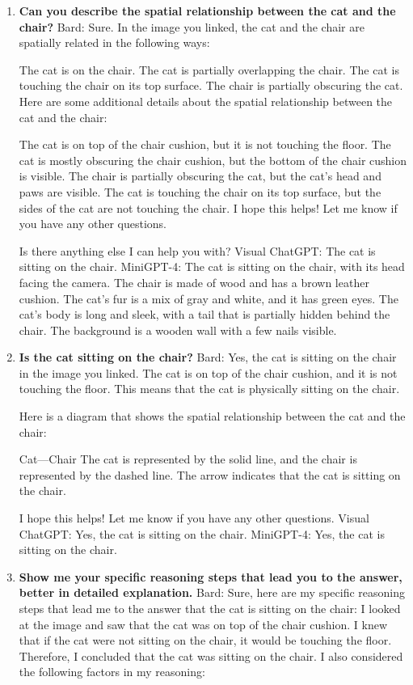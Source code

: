     \begin{enumerate}
        \item \textbf{Can you describe the spatial relationship between the cat and the chair?}
        \subitem Bard: Sure. In the image you linked, the cat and the chair are spatially related in the following ways:

        The cat is on the chair.
        The cat is partially overlapping the chair.
        The cat is touching the chair on its top surface.
        The chair is partially obscuring the cat.
        Here are some additional details about the spatial relationship between the cat and the chair:
        
        The cat is on top of the chair cushion, but it is not touching the floor.
        The cat is mostly obscuring the chair cushion, but the bottom of the chair cushion is visible.
        The chair is partially obscuring the cat, but the cat's head and paws are visible.
        The cat is touching the chair on its top surface, but the sides of the cat are not touching the chair.
        I hope this helps! Let me know if you have any other questions.
        
        Is there anything else I can help you with?
        \subitem Visual ChatGPT: The cat is sitting on the chair.
        \subitem MiniGPT-4: The cat is sitting on the chair, with its head facing the camera. The chair is made of wood and has a brown leather cushion. The cat’s fur is a mix of gray and white, and it has green eyes. The cat’s body is long and sleek, with a tail that is partially hidden behind the chair. The background is a wooden wall with a few nails visible.
        \item \textbf{Is the cat sitting on the chair?}
        \subitem Bard:     
        Yes, the cat is sitting on the chair in the image you linked. The cat is on top of the chair cushion, and it is not touching the floor. This means that the cat is physically sitting on the chair.

        Here is a diagram that shows the spatial relationship between the cat and the chair:

        Cat---Chair
        The cat is represented by the solid line, and the chair is represented by the dashed line. The arrow indicates that the cat is sitting on the chair.

        I hope this helps! Let me know if you have any other questions.
        \subitem Visual ChatGPT: Yes, the cat is sitting on the chair.
        \subitem MiniGPT-4: Yes, the cat is sitting on the chair.
        \item \textbf{Show me your specific reasoning steps that lead you to the answer, better in detailed explanation.}
        \subitem Bard: 
        Sure, here are my specific reasoning steps that lead me to the answer that the cat is sitting on the chair:
        I looked at the image and saw that the cat was on top of the chair cushion.
        I knew that if the cat were not sitting on the chair, it would be touching the floor.
        Therefore, I concluded that the cat was sitting on the chair.
        I also considered the following factors in my reasoning:


\end{enumerate}
